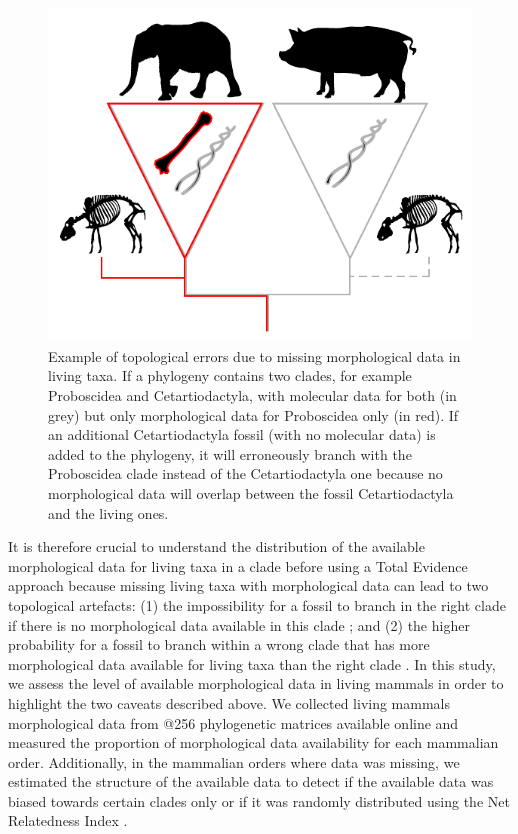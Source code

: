 \documentclass[12pt,letterpaper]{article}
\begin{document}
\begin{figure}[!htbp]
\centering
    \includegraphics[width=1\textwidth]{MissingDataFigure.pdf}
\caption{Example of topological errors due to missing morphological data in living taxa. If a phylogeny contains two clades, for example Proboscidea and Cetartiodactyla, with molecular data for both (in grey) but only morphological data for Proboscidea only (in red). If an additional Cetartiodactyla fossil (with no molecular data) is added to the phylogeny, it will erroneously branch with the Proboscidea clade instead of the Cetartiodactyla one because no morphological data will overlap between the fossil Cetartiodactyla and the living ones.}
\label{Figure_missing_data_problem}
\end{figure}

It is therefore crucial to understand the distribution of the available morphological data for living taxa in a clade before using a Total Evidence approach because missing living taxa with morphological data can lead to two topological artefacts: (1) the impossibility for a fossil to branch in the right clade if there is no morphological data available in this clade \cite{GuillermeCooper}; and (2) the higher probability for a fossil to branch within a wrong clade that has more morphological data available for living taxa than the right clade \cite{GuillermeCooper}. In this study, we assess the level of available morphological data in living mammals in order to highlight the two caveats described above.
We collected living mammals morphological data from @256 phylogenetic matrices available online and measured the proportion of morphological data availability for each mammalian order. Additionally, in the mammalian orders where data was missing, we estimated the structure of the available data to detect if the available data was biased towards certain clades only or if it was randomly distributed using the Net Relatedness Index \cite{webb2002phylogenies}.
\end{document}
